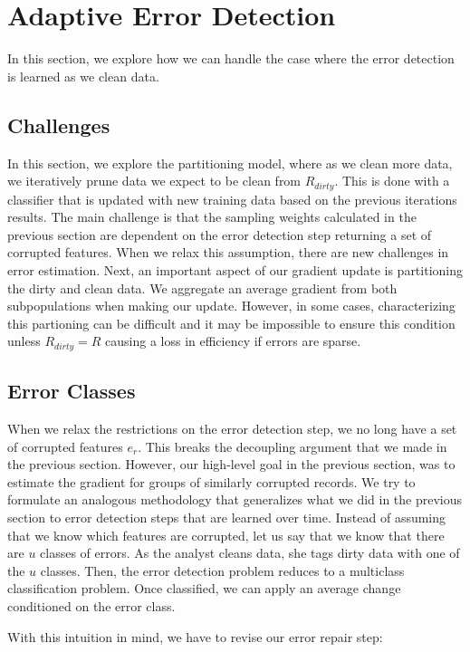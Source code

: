 \section{Adaptive Error Detection}\label{imperfect} 
In this section, we explore how we can handle the case where the error detection is learned as we clean data.

\subsection{Challenges}
In this section, we explore the partitioning model, where as we clean more data, we iteratively prune data we expect to be clean from $R_{dirty}$.
This is done with a classifier that is updated with new training data based on the previous iterations results.
The main challenge is that the sampling weights calculated in the previous section are dependent on the error detection step returning a set of corrupted features.
When we relax this assumption, there are new challenges in error estimation.
Next, an important aspect of our gradient update is partitioning the dirty and clean data.
We aggregate an average gradient from both subpopulations when making our update.
However, in some cases, characterizing this partioning can be difficult and it may be impossible to ensure this condition unless $R_{dirty} = R$ causing a loss in efficiency if errors are sparse. 

\subsection{Error Classes}
When we relax the restrictions on the error detection step, we no long have a set of corrupted features $e_r$.
This breaks the decoupling argument that we made in the previous section.
However, our high-level goal in the previous section, was to estimate the gradient for groups of similarly corrupted records.
We try to formulate an analogous methodology that generalizes what we did in the previous section to error detection steps that are learned over time.
Instead of assuming that we know which features are corrupted, let us say that we know that there are $u$ classes of errors.
As the analyst cleans data, she tags dirty data with one of the $u$ classes.
Then, the error detection problem reduces to a multiclass classification problem.
Once classified, we can apply an average change conditioned on the error class.

With this intuition in mind, we have to revise our error repair step:
\vspace{0.5em}

